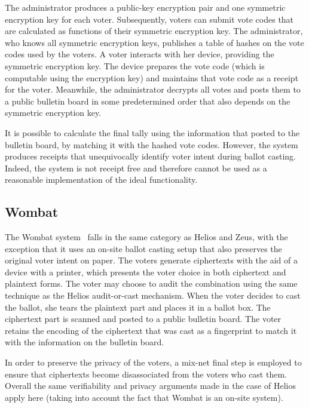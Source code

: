 The administrator produces a public-key encryption pair and one
symmetric encryption key for each voter. Subsequently, voters can
submit vote codes that are calculated as functions of their symmetric
encryption key. The administrator, who knows all symmetric encryption
keys, publishes a table of hashes on the vote codes used by the
voters. A voter interacts with her device, providing the symmetric
encryption key. The device prepares the vote code (which is computable
using the encryption key) and maintains that vote code as a receipt
for the voter. Meanwhile, the administrator decrypts all votes and
posts them to a public bulletin board in some predetermined order that
also depends on the symmetric encryption key.

It is possible to calculate the final tally using the information that
posted to the bulletin board, by matching it with the hashed vote
codes. However, the system produces receipts that unequivocally
identify voter intent during ballot casting. Indeed, the system is not
receipt free and therefore cannot be used as a reasonable
implementation of the ideal functionality.

\subsection{Wombat}

The Wombat system~\cite{ben2012new} falls in the same category as
Helios and Zeus, with the exception that it uses an on-site ballot
casting setup that also preserves the original voter intent on paper.
The voters generate ciphertexts with the aid of a device with a
printer, which presents the voter choice in both ciphertext and
plaintext forms. The voter may choose to audit the combination using
the same technique as the Helios audit-or-cast mechanism. When the
voter decides to cast the ballot, she tears the plaintext part and
places it in a ballot box. The ciphertext part is scanned and posted
to a public bulletin board. The voter retains the encoding of the
ciphertext that was cast as a fingerprint to match it with the
information on the bulletin board.

In order to preserve the privacy of the voters, a mix-net final step
is employed to ensure that ciphertexts become disassociated from the
voters who cast them. Overall the same verifiability and privacy
arguments made in the case of Helios apply here (taking into account
the fact that Wombat is an on-site system).

\newcommand{\PaV}{Pr{\^{e}}t {\`{a}} Voter\xspace}


